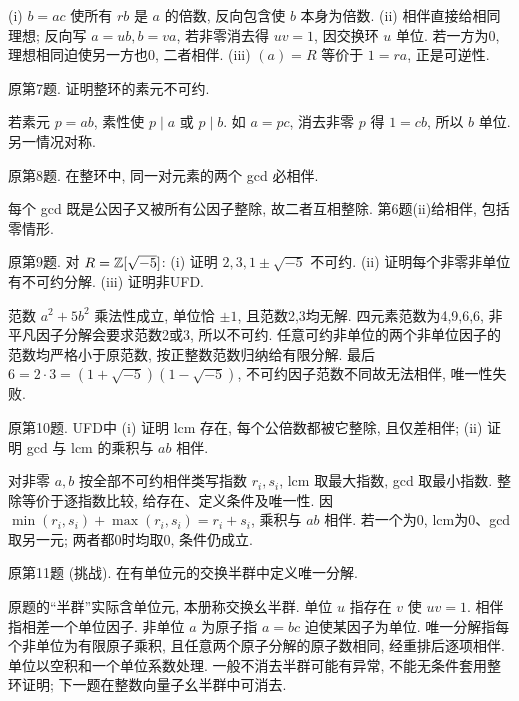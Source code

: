 \begin{solution}
(i) $b=ac$ 使所有 $rb$ 是 $a$ 的倍数, 反向包含使 $b$ 本身为倍数. (ii) 相伴直接给相同理想; 反向写 $a=ub,b=va$, 若非零消去得 $uv=1$, 因交换环 $u$ 单位. 若一方为0, 理想相同迫使另一方也0, 二者相伴. (iii) $(a)=R$ 等价于 $1=ra$, 正是可逆性.
\end{solution}
\begin{exercise}原第7题. 证明整环的素元不可约.\end{exercise}
\begin{solution}
若素元 $p=ab$, 素性使 $p\mid a$ 或 $p\mid b$. 如 $a=pc$, 消去非零 $p$ 得 $1=cb$, 所以 $b$ 单位. 另一情况对称.
\end{solution}
\begin{exercise}原第8题. 在整环中, 同一对元素的两个 gcd 必相伴.\end{exercise}
\begin{solution}
每个 gcd 既是公因子又被所有公因子整除, 故二者互相整除. 第6题(ii)给相伴, 包括零情形.
\end{solution}
\begin{exercise}原第9题. 对 $R=\mathbb Z[\sqrt{-5}]$: (i) 证明 $2,3,1\pm\sqrt{-5}$ 不可约. (ii) 证明每个非零非单位有不可约分解. (iii) 证明非UFD.\end{exercise}
\begin{solution}
范数 $a^2+5b^2$ 乘法性成立, 单位恰 $\pm1$, 且范数2,3均无解. 四元素范数为4,9,6,6, 非平凡因子分解会要求范数2或3, 所以不可约. 任意可约非单位的两个非单位因子的范数均严格小于原范数, 按正整数范数归纳给有限分解. 最后 $6=2\cdot3=(1+\sqrt{-5})(1-\sqrt{-5})$, 不可约因子范数不同故无法相伴, 唯一性失败.
\end{solution}
\begin{exercise}原第10题. UFD中 (i) 证明 lcm 存在, 每个公倍数都被它整除, 且仅差相伴; (ii) 证明 gcd 与 lcm 的乘积与 $ab$ 相伴.\end{exercise}
\begin{solution}
对非零 $a,b$ 按全部不可约相伴类写指数 $r_i,s_i$, lcm 取最大指数, gcd 取最小指数. 整除等价于逐指数比较, 给存在、定义条件及唯一性. 因 $\min(r_i,s_i)+\max(r_i,s_i)=r_i+s_i$, 乘积与 $ab$ 相伴. 若一个为0, lcm为0、gcd取另一元; 两者都0时均取0, 条件仍成立.
\end{solution}
\begin{exercise}原第11题 (挑战). 在有单位元的交换半群中定义唯一分解.\end{exercise}
\begin{solution}
原题的“半群”实际含单位元, 本册称交换幺半群. 单位 $u$ 指存在 $v$ 使 $uv=1$. 相伴指相差一个单位因子. 非单位 $a$ 为原子指 $a=bc$ 迫使某因子为单位. 唯一分解指每个非单位为有限原子乘积, 且任意两个原子分解的原子数相同, 经重排后逐项相伴. 单位以空积和一个单位系数处理. 一般不消去半群可能有异常, 不能无条件套用整环证明; 下一题在整数向量子幺半群中可消去.
\end{solution}
